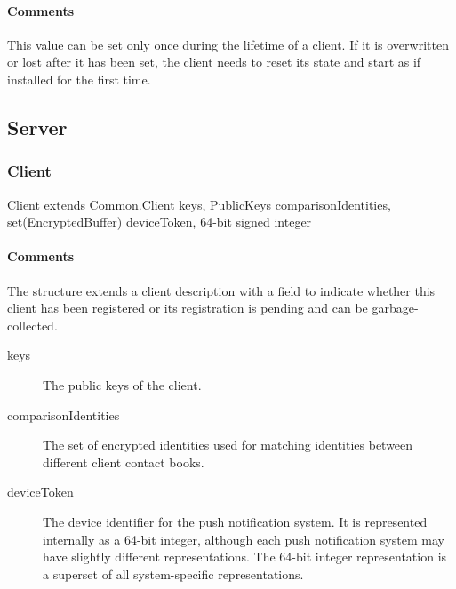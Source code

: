 \documentclass[a4paper,10pt]{article}
\begin{document}
\begin{inparaitem}[ ]
 \item \unique
 \item \secure
 \item \persistent
\end{inparaitem}

\paragraph*{Comments}
This value can be set only once during the lifetime of a client. If it is overwritten or lost after it has been set, the client needs to reset its state and start as if installed 
for the first time.

\subsection{Server}
\label{sec:structure:server}

\subsubsection{Client}

\begin{verbbox}
Client extends Common.Client
{
  keys, PublicKeys
  comparisonIdentities, set(EncryptedBuffer)
  deviceToken, 64-bit signed integer
}
\end{verbbox}
\begin{center}
\theverbbox
\end{center}

\begin{inparaitem}[ ]
 \item \infrastructure
\end{inparaitem}

\paragraph*{Comments}

The structure extends a client description with a field to indicate whether this client has been registered or its registration is pending and can be garbage-collected.

\SpecialItem
\begin{description}
 \item[keys] The public keys of the client.
 \item[comparisonIdentities] The set of encrypted identities used for matching identities between different client contact books.
 \item[deviceToken] The device identifier for the push notification system. It is represented internally as a 64-bit integer, although each push notification system may have slightly different representations. The 64-bit integer representation is a superset of all system-specific representations.
\end{description}
\end{document}
